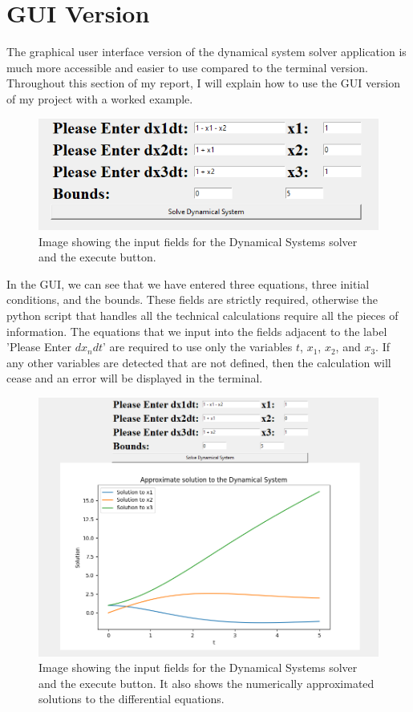 \documentclass[12pt]{report}
\begin{document}
\section*{GUI Version}
The graphical user interface version of the dynamical system solver application is much more accessible and easier to use compared to the terminal version. Throughout this section of my report, I will explain how to use the GUI version of my project with a worked example.
\begin{figure}[H]
    \centering
    \includegraphics[scale = 0.8]{demo 1.png}
    \caption{Image showing the input fields for the Dynamical Systems solver and the execute button.}
\end{figure}
In the GUI, we can see that we have entered three equations, three initial conditions, and the bounds. These fields are strictly required, otherwise the python script that handles all the technical calculations require all the pieces of information. The equations that we input into the fields adjacent to the label 'Please Enter $dx_{n}dt$' are required to use only the variables $t$, $x_{1}$, $x_{2}$, and $x_{3}$. If any other variables are detected that are not defined, then the calculation will cease and an error will be displayed in the terminal. 
\begin{figure}[H]
    \centering
    \includegraphics[scale = 0.7]{demo 2.png}
    \caption{Image showing the input fields for the Dynamical Systems solver and the execute button. It also shows the numerically approximated solutions to the differential equations.}
\end{figure}
\end{document}
